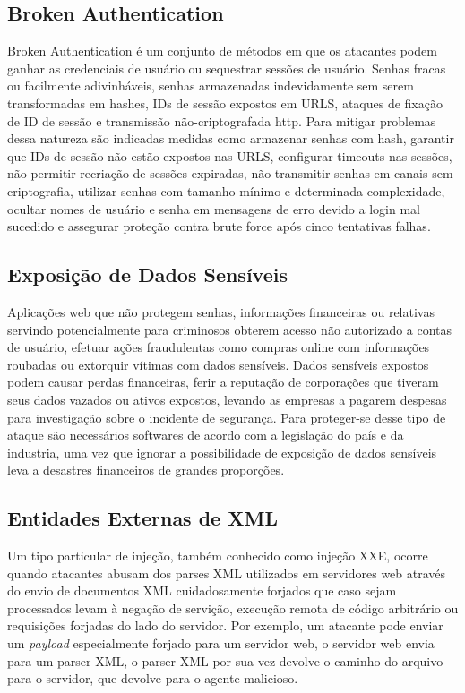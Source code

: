 \subsection{Broken Authentication}
Broken Authentication é um conjunto de métodos em que os atacantes podem ganhar as credenciais de usuário ou sequestrar sessões de usuário. Senhas fracas ou facilmente adivinháveis, senhas armazenadas indevidamente sem serem transformadas em hashes, IDs de sessão expostos em URLS, ataques de fixação de ID de sessão \cite{session_fixation_invicti} e transmissão não-criptografada http.
Para mitigar problemas dessa natureza são indicadas medidas como armazenar senhas com hash, garantir que IDs de sessão não estão expostos nas URLS, configurar timeouts nas sessões, não permitir recriação de sessões expiradas, não transmitir senhas em canais sem criptografia, utilizar senhas com tamanho mínimo e determinada complexidade, ocultar nomes de usuário e senha em mensagens de erro devido a login mal sucedido e assegurar proteção contra brute force após cinco tentativas falhas.

\subsection{Exposição de Dados Sensíveis}
Aplicações web que não protegem senhas, informações financeiras ou relativas servindo potencialmente para criminosos obterem acesso não autorizado a contas de usuário, efetuar ações fraudulentas como compras online com informações roubadas ou extorquir vítimas com dados sensíveis. Dados sensíveis expostos podem causar perdas financeiras, ferir a reputação de corporações que tiveram seus dados vazados ou ativos expostos, levando as empresas a pagarem despesas para investigação sobre o incidente de segurança. Para proteger-se desse tipo de ataque são necessários softwares de acordo com a legislação do país e da industria, uma vez que ignorar a possibilidade de exposição de dados sensíveis leva a desastres financeiros de grandes proporções. 

\subsection{Entidades Externas de XML}
Um tipo particular de injeção, também conhecido como injeção XXE, ocorre quando atacantes abusam dos parses XML utilizados em servidores web através do envio de documentos XML cuidadosamente forjados que caso sejam processados levam à negação de servição, execução remota de código arbitrário ou requisições forjadas do lado do servidor.
Por exemplo, um atacante pode enviar um \textit{payload} especialmente forjado para um servidor web, o servidor web envia para um parser XML, o parser XML por sua vez devolve o caminho do arquivo para o servidor, que devolve para o agente malicioso.

